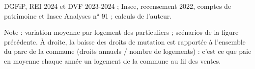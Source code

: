 DGFiP, REI 2024 et DVF 2023-2024 ; Insee, recensement 2022, comptes de patrimoine et Insee Analyses n° 91 ; calculs de l'auteur.\par Note : variation moyenne par logement des particuliers ; scénarios de la figure précédente. À droite, la baisse des droits de mutation est rapportée à l'ensemble du parc de la commune (droits annuels / nombre de logements) : c'est ce que paie en moyenne chaque année un logement de la commune au fil des ventes.
